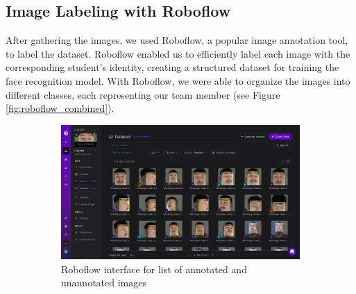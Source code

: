 \subsection{Image Labeling with Roboflow}
After gathering the images, we used Roboflow, a popular image annotation tool, to label the dataset. Roboflow enabled us to efficiently label each image with the corresponding student’s identity, creating a structured dataset for training the face recognition model. With Roboflow, we were able to organize the images into different classes, each representing our team member (see Figure \ref{fig:roboflow_combined}).

\begin{figure}[h!]
    \centering
    \begin{subfigure}[b]{0.55\textwidth}
        \centering
        \includegraphics[width=\textwidth]{images/roboflow_ss.png}
        \caption{Roboflow interface for list of annotated and unannotated images}
        \label{fig:ex_roboflow}
    \end{subfigure}
    \hfill
    \begin{subfigure}[b]{0.35\textwidth}
        \centering

\end{subfigure}
\end{figure}
